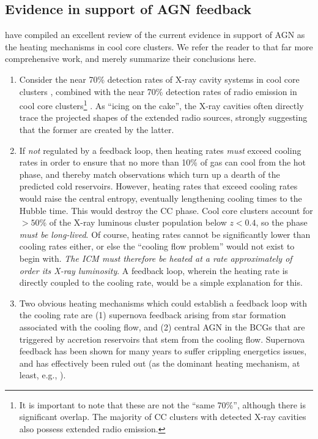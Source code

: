 \subsection{Evidence in support of AGN feedback}


\citet{mcnamara07} have compiled an excellent review of the current evidence in support of AGN as the heating mechanisms in 
cool core clusters. We refer the reader to that far more comprehensive work, and merely summarize their conclusions here. 



\begin{enumerate}


\item Consider the near 70\% detection rates of X-ray cavity systems in cool core clusters \citep{dunn05}, combined with the near 70\% detection rates
of radio emission in cool core clusters\footnote{It is important to note that these are not the ``same 70\%'', although there is significant overlap. The majority of CC clusters with detected X-ray cavities also possess extended radio emission.} \citep{burns90}. 
As ``icing on the cake'', the X-ray cavities often directly trace
the projected shapes of the extended radio sources, strongly suggesting that the former are created by the latter. 




\item If {\it not} regulated by a feedback loop, then heating rates {\it must} exceed cooling rates in order to ensure 
that no more than 10\% of gas can cool from the hot phase, and thereby match observations which turn up a dearth of the 
predicted cold reservoirs. However, heating rates that exceed cooling rates would raise the central entropy, eventually 
lengthening cooling times to the Hubble time. 
This would destroy the CC phase. Cool core clusters account for $>50$\% of the X-ray luminous 
cluster population below $z<0.4$, so the phase {\it must be long-lived}.
Of course, heating rates cannot be significantly lower than cooling rates either, or else the ``cooling flow problem'' 
would not exist to begin with. {\it The ICM must therefore be heated at a rate approximately of order its X-ray luminosity}.
A feedback loop, wherein the heating rate is directly coupled to the cooling rate, would be a simple explanation for this. 


\item Two obvious heating mechanisms which could establish a feedback loop with the cooling rate are (1) supernova feedback 
arising from star formation associated with the cooling flow, and (2) central AGN in the BCGs that are triggered by 
accretion reservoirs that stem from the cooling flow. Supernova feedback has been shown for many years to suffer crippling energetics issues, 
and has effectively been ruled out (as the dominant heating mechanism, at least, e.g., \citealt{voit05}). 




\end{enumerate}
